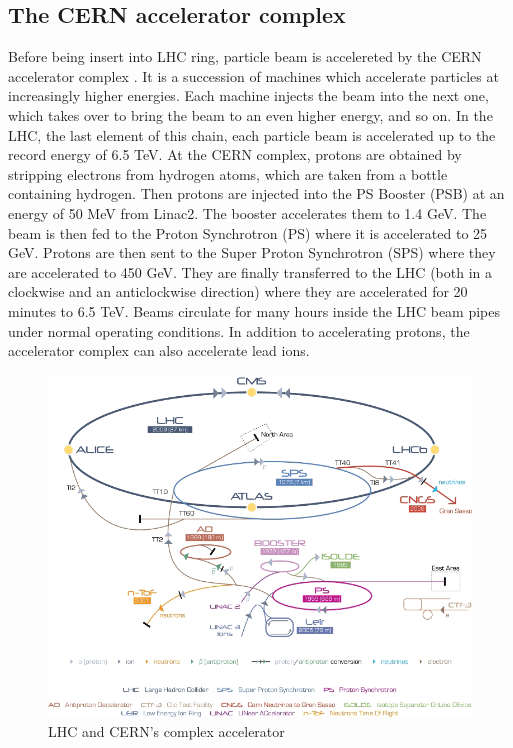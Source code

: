 \documentclass[a4paper, oneside]{book}
\begin{document}
				\subsection{The CERN accelerator complex}
					Before being insert into LHC ring, particle beam is accelereted by the CERN accelerator complex \cite{Acc. complex}. It is a succession of machines which accelerate particles at increasingly higher energies. Each machine injects the beam into the next one, which takes over to bring the beam to an even higher energy, and so on. In  the  LHC, the  last  element  of  this  chain, each particle beam is accelerated up to the record energy of 6.5 TeV. At the CERN complex, protons are obtained by stripping electrons from hydrogen atoms, which are taken from a bottle containing hydrogen. Then protons are injected into the PS Booster (PSB) at an  energy of 50 MeV from Linac2. The  booster  accelerates  them  to  1.4  GeV.  The  beam  is  then  fed  to  the  Proton  Synchrotron  (PS)  where  it  is  accelerated  to  25 GeV. Protons are then sent to the Super Proton Synchrotron (SPS) where they are accelerated to 450 GeV. They  are  finally  transferred  to  the  LHC  (both  in  a  clockwise  and an anticlockwise direction) where they are accelerated for 20 minutes to 6.5 TeV. Beams circulate for many hours inside the LHC beam pipes under normal operating conditions.
					In addition to accelerating protons, the accelerator complex can also accelerate lead ions. 
					\begin{figure}
						\centering
						\includegraphics[width=0.45\textheight]{tesi_images/CERN.png}
						\caption{LHC and CERN's complex accelerator}
						\label{fig:CERN structure}
					\end{figure}
\end{document}
